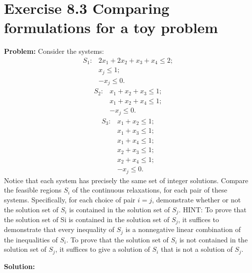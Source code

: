 \section{Exercise 8.3 Comparing formulations for a toy problem}
\textbf{Problem:} Consider the systems:
\begin{equation}
\label{eq: s1}
  \begin{array}{lrcll}
    S_{1}: & 2x_1+2x_2+x_3+x_4\leq 2;\\
    & x_j\leq 1;\\
    & -x_j\leq 0.
  \end{array}
\end{equation}
\begin{equation}
\label{eq: s2}
  \begin{array}{lrcll}
    S_{2}: & x_1+x_2+x_3\leq 1;\\
    & x_1+x_2+x_4\leq 1;\\
    & -x_j\leq 0.
  \end{array}
\end{equation}
\begin{equation}
\label{eq: s3}
  \begin{array}{lrcll}
    S_{3}: & x_1+x_2\leq 1;\\
    & x_1+x_3\leq 1;\\
    & x_1+x_4\leq 1;\\
    & x_2+x_3\leq 1;\\
    & x_2+x_4\leq 1;\\
    & -x_j\leq 0.
  \end{array}
\end{equation}
Notice that each system has precisely the same set of integer solutions. Compare the feasible regions $S_i$ of the continuous relaxations, for each pair of these systems. Specifically, for each choice of pair $i=j$, demonstrate whether or not the solution set of $S_i$ is contained in the solution set of $S_j$. HINT: To prove that the solution set of Si is contained in the solution set of $S_j$, it suffices to demonstrate that every inequality of $S_j$ is a nonnegative linear combination of the inequalities of $S_i$. To prove that the solution set of $S_i$ is not contained in the solution set of $S_j$, it suffices to give a solution of $S_i$ that is not a solution of $S_j$.


\textbf{Solution:} 